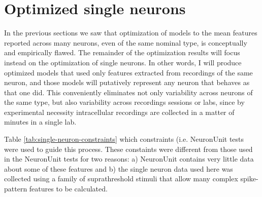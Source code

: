\section{Optimized single neurons}
In the previous sections we saw that optimization of models to the mean features reported across many neurons, even of the same nominal type, is conceptually and empirically flawed.
The remainder of the optimization results will focus instead on the optimization of single neurons.
In other words, I will produce optimized models that used only features extracted from recordings of the same neuron, and those models will putatively represent any neuron that behaves as that one did.
This conveniently eliminates not only variability across neurons of the same type, but also variability across recordings sessions or labs, since by experimental necessity intracellular recordings are collected in a matter of minutes in a single lab.

Table \ref{tab:single-neuron-constraints} which constraints (i.e. NeuronUnit tests were used to guide this process.  
These constaints were different from those used in the NeuronUnit tests for two reasons: a) NeuronUnit contains very little data about some of these features and b) the single neuron data used here was collected using a family of suprathreshold stimuli that allow many complex spike-pattern features to be calculated.

